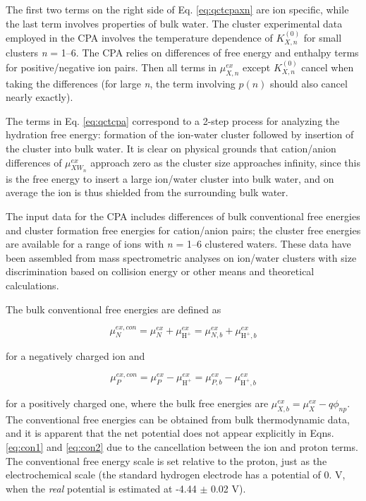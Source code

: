 \begin{cpa}
  \noindent The first two terms on the right side of Eq. \ref{eq:qctcpaxn} are ion specific, while the last term involves properties of bulk water.
  The cluster experimental data employed in the CPA\cite{coe1998cpa1} involves the temperature dependence of $K_{X,n}^{(0)}$ for small clusters 
  \emph{n} = 1--6. The CPA relies on differences of free energy and enthalpy terms for positive/negative ion pairs. Then all terms in $\mu^{ex}_{X,n}$ 
  except $K_{X,n}^{(0)}$ cancel when taking the differences (for large \emph{n}, the term involving $p(n)$ should also cancel nearly exactly).

  The terms in Eq. \ref{eq:qctcpa} correspond to a 2-step process for analyzing the hydration free energy: formation of the ion-water cluster 
  followed by insertion of the cluster into bulk water. It is clear on physical grounds that cation/anion differences of $\mu^{ex}_{XW_n}$
  approach zero as the cluster size approaches infinity, since this is the free energy to insert a large ion/water cluster into bulk water, and on
  average the ion is thus shielded from the surrounding bulk water. 

  The input data for the CPA\cite{coe1998cpa1} includes differences of bulk conventional free energies and cluster formation free energies for cation/anion 
  pairs; the cluster free energies are available for a range of ions with \emph{n} = 1--6 clustered waters. These data have been assembled from mass 
  spectrometric analyses on ion/water clusters with size discrimination based on collision energy\cite{wheeler2015hydration} or other means and theoretical 
  calculations\cite{coe1998cpa1,coe2001cpa2,coe2002cpa3,donald2010expand_cpa,kelly2006cpa}.
  
  The bulk conventional free energies are defined as
  
  \begin{equation}
    \mu_N^{ex,con} =  \mu^{ex}_{N} + \mu^{ex}_{\mathrm{H}^+} = \mu^{ex}_{N,b} + \mu^{ex}_{\mathrm{H}^+,b}
    \label{eq:con1}
  \end{equation}

  \noindent for a negatively charged ion and

  \begin{equation}
    \mu_P^{ex,con} =  \mu^{ex}_{P} - \mu^{ex}_{\mathrm{H}^+} = \mu^{ex}_{P,b} - \mu^{ex}_{\mathrm{H}^+,b}
    \label{eq:con2}
  \end{equation}
  
  \noindent for a positively charged one, where the bulk free energies are $\mu^{ex}_{X,b} = \mu^{ex}_{X} - q\phi_{np}$. The conventional free 
  energies can be obtained from bulk thermodynamic data, and it is apparent that the net potential does not appear explicitly in Eqns. \ref{eq:con1} 
  and \ref{eq:con2} due to the cancellation between the ion and proton terms. The conventional free energy scale is set relative to the proton,
  just as the electrochemical scale (the standard hydrogen electrode has a potential of 0. V, when the \emph{real} potential is estimated at 
  -4.44 $\pm$ 0.02 V\cite{trasatti1986absolute}).


\end{cpa}
